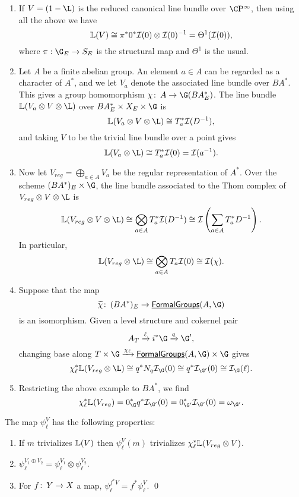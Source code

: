 \begin{enumerate}
\item If $V = (1 - \L)$ is the reduced canonical line bundle over $\CP^\infty$, then using all the above we have \[\mathbb{L}(V) \cong \pi^* 0^* \mathcal{I} (0) \otimes \mathcal{I}(0)^{-1} = \Theta^1(\mathcal{I}(0)),\] where $\pi: \G_E \to S_E$ is the structural map and $\Theta^1$ is the usual.
\item Let $A$ be a finite abelian group.  An element $a \in A$ can be regarded as a character of $A^*$, and we let $V_a$ denote the associated line bundle over $BA^*$.  This gives a group homomorphism $\chi\co A \to \G(BA^*_E)$.  The line bundle $\ThomSheaf{V_a \otimes V \otimes \L}$ over $BA^*_E \times X_E \times \G$ is \[\ThomSheaf{V_a \otimes V \otimes \L} \cong T_a^* \sheaf I(D^{-1}),\] and taking $V$ to be the trivial line bundle over a point gives \[\ThomSheaf{V_a \otimes \L} \cong T_a^* \sheaf I(0) = \sheaf I(a^{-1}).\]
\item Now let $V_{reg} = \bigoplus_{a \in A} V_a$ be the regular representation of $A^*$.  Over the scheme $(BA^*)_E \times \G$, the line bundle associated to the Thom complex of $V_{reg} \otimes V \otimes \L$ is \[\ThomSheaf{V_{reg} \otimes V \otimes \L} \cong \bigotimes_{a \in A} T_a^* \sheaf I(D^{-1}) \cong \sheaf I \left( \sum_{a \in A} T_a^* D^{-1} \right).\]  In particular, \[\ThomSheaf{V_{reg} \otimes \L} \cong \bigotimes_{a \in A} T_a \sheaf I(0) \cong \sheaf I(\chi).\]
\item Suppose that the map \[\widetilde \chi\co (BA^*)_E \to \InternalHom{FormalGroups}(A, \G)\] is an isomorphism.  Given a level structure and cokernel pair \[A_T \xrightarrow{\ell} i^* \G \xrightarrow{q} \G',\] changing base along $T \times \G \xrightarrow{\chi_\ell} \InternalHom{FormalGroups}(A, \G) \times \G$ gives \[\chi_\ell^* \ThomSheaf{V_{reg} \otimes \L} \cong q^* N_q \sheaf I_{\G}(0) \cong q^* \sheaf I_{\G'}(0) \cong \sheaf I_{\G}(\ell).\]
\item Restricting the above example to $BA^*$, we find \[\chi_\ell^* \ThomSheaf{V_{reg}} = 0_{\G}^* q^* \sheaf I_{\G'}(0) = 0_{\G'}^* \sheaf I_{\G'}(0) = \omega_{\G'}.\]
\end{enumerate}



\begin{lemma}
The map $\psi_\ell^V$ has the following properties:
\begin{enumerate}
\item If $m$ trivializes $\mathbb{L}(V)$ then $\psi_\ell^V(m)$ trivializes $\chi_\ell^* \mathbb{L}(V_{reg} \otimes V)$.
\item $\psi_\ell^{V_1 \oplus V_2} = \psi_\ell^{V_1} \otimes \psi_\ell^{V_2}$.
\item For $f\colon\thinspace Y \to X$ a map, $\psi_\ell^{f^* V} = f^* \psi_\ell^V$. \qed
\end{enumerate}
\end{lemma}


